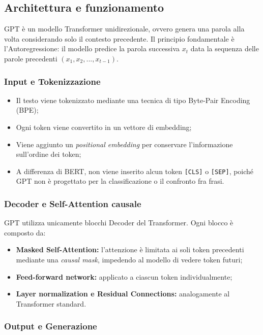 \subsection{Architettura e funzionamento}

GPT è un modello Transformer unidirezionale, ovvero genera una parola alla volta considerando solo il contesto precedente. Il principio fondamentale è l'Autoregressione: il modello predice la parola successiva $x_t$ data la sequenza delle parole precedenti $(x_1, x_2, ..., x_{t-1})$.

\subsubsection{Input e Tokenizzazione}

\begin{itemize}
    \item Il testo viene tokenizzato mediante una tecnica di tipo Byte-Pair Encoding (BPE);
    \item Ogni token viene convertito in un vettore di embedding;
    \item Viene aggiunto un \textit{positional embedding} per conservare l’informazione sull’ordine dei token;
    \item A differenza di BERT, non viene inserito alcun token \texttt{[CLS]} o \texttt{[SEP]}, poiché GPT non è progettato per la classificazione o il confronto fra frasi.
\end{itemize}

\subsubsection{Decoder e Self-Attention causale}

GPT utilizza unicamente blocchi Decoder del Transformer. Ogni blocco è composto da:
\begin{itemize}
    \item \textbf{Masked Self-Attention:} l'attenzione è limitata ai soli token precedenti mediante una \textit{causal mask}, impedendo al modello di vedere token futuri;
    \item \textbf{Feed-forward network:} applicato a ciascun token individualmente;
    \item \textbf{Layer normalization e Residual Connections:} analogamente al Transformer standard.
\end{itemize}

\subsubsection{Output e Generazione}

